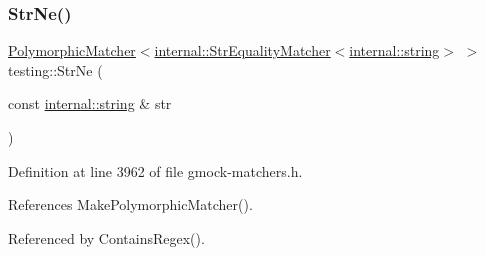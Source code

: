 \subsubsection{\texorpdfstring{Str\+Ne()}{StrNe()}}
{\footnotesize\ttfamily \hyperlink{classtesting_1_1PolymorphicMatcher}{Polymorphic\+Matcher}$<$\hyperlink{classtesting_1_1internal_1_1StrEqualityMatcher}{internal\+::\+Str\+Equality\+Matcher}$<$\hyperlink{namespacetesting_1_1internal_a8e8ff5b11e64078831112677156cb111}{internal\+::string}$>$ $>$ testing\+::\+Str\+Ne (\begin{DoxyParamCaption}\item[{const \hyperlink{namespacetesting_1_1internal_a8e8ff5b11e64078831112677156cb111}{internal\+::string} \&}]{str }\end{DoxyParamCaption})\hspace{0.3cm}{\ttfamily [inline]}}



Definition at line 3962 of file gmock-\/matchers.\+h.



References Make\+Polymorphic\+Matcher().



Referenced by Contains\+Regex().



